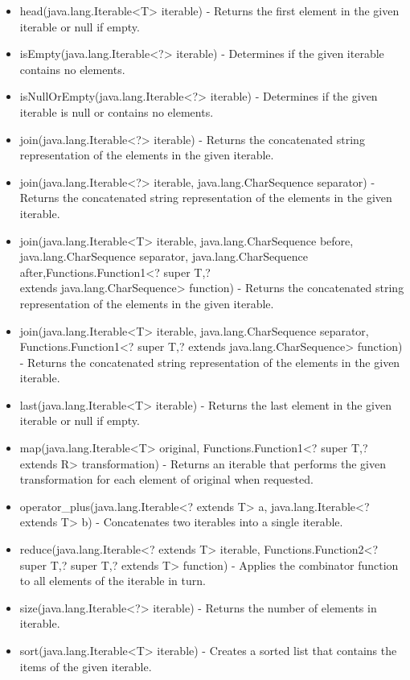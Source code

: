 \begin{itemize}
	\item head(java.lang.Iterable<T> iterable) - Returns the first element in the given iterable or null if empty.
	\item isEmpty(java.lang.Iterable<?> iterable) - Determines if the given iterable contains no elements.
	\item isNullOrEmpty(java.lang.Iterable<?> iterable) - Determines if the given iterable is null or contains no elements.
	\item join(java.lang.Iterable<?> iterable) - Returns the concatenated string representation of the elements in the given iterable.
	\item join(java.lang.Iterable<?> iterable, java.lang.CharSequence separator) - Returns the concatenated string representation of the elements in the given iterable.
	\item join(java.lang.Iterable<T> iterable, java.lang.CharSequence before, java.lang.CharSequence separator, java.lang.CharSequence after,Functions.Function1<? super T,? \\extends java.lang.CharSequence> function) - Returns the concatenated string representation of the elements in the given iterable.
	\item join(java.lang.Iterable<T> iterable, java.lang.CharSequence separator, Functions.Function1<? super T,? extends java.lang.CharSequence> function) - Returns the concatenated string representation of the elements in the given iterable.
	\item last(java.lang.Iterable<T> iterable) - Returns the last element in the given iterable or null if empty.
	\item map(java.lang.Iterable<T> original, Functions.Function1<? super T,? extends R> transformation) - Returns an iterable that performs the given transformation for each element of original when requested.
	\item operator\_plus(java.lang.Iterable<? extends T> a, java.lang.Iterable<? extends T> b) - Concatenates two iterables into a single iterable.
	\item reduce(java.lang.Iterable<? extends T> iterable, Functions.Function2<? super T,? super T,? extends T> function) - Applies the combinator function to all elements of the iterable in turn.
	\item size(java.lang.Iterable<?> iterable) - Returns the number of elements in iterable.
	\item sort(java.lang.Iterable<T> iterable) - Creates a sorted list that contains the items of the given iterable.

\end{itemize}
